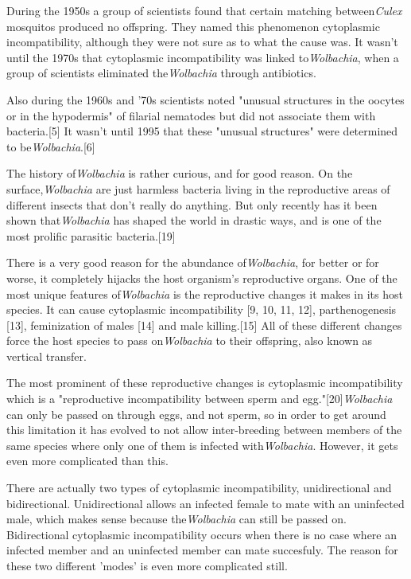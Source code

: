 \documentclass[twocolumn]{article}
\begin{document}
During the 1950s a group of scientists found that certain matching between\textit{Culex} mosquitos produced no offspring. They named this phenomenon cytoplasmic incompatibility, although they were not sure as to what the cause was.\cite{Wcyto_iso} It wasn't until the 1970s that cytoplasmic incompatibility was linked to\textit{Wolbachia}, when a group of scientists eliminated the\textit{Wolbachia} through antibiotics.\cite{Wcyto_cause}

Also during the 1960s and '70s scientists noted "unusual structures in the oocytes or in the hypodermis" of filarial nematodes but did not associate them with bacteria.[5] It wasn't until 1995 that these "unusual structures" were determined to be\textit{Wolbachia}.[6]

The history of\textit{Wolbachia} is rather curious, and for good reason. On the surface,\textit{Wolbachia} are just harmless bacteria living in the reproductive areas of different insects that don't really do anything. But only recently has it been shown that\textit{Wolbachia} has shaped the world in drastic ways, and is one of the most prolific parasitic bacteria.[19]

There is a very good reason for the abundance of\textit{Wolbachia}, for better or for worse, it completely hijacks the host organism's reproductive organs. One of the most unique features of\textit{Wolbachia} is the reproductive changes it makes in its host species. It can cause cytoplasmic incompatibility [9, 10, 11, 12], parthenogenesis [13], feminization of males [14] and male killing.[15] All of these different changes force the host species to pass on\textit{Wolbachia} to their offspring, also known as vertical transfer.

The most prominent of these reproductive changes is cytoplasmic incompatibility which is a "reproductive incompatibility between sperm and egg."[20]\textit{Wolbachia} can only be passed on through eggs, and not sperm, so in order to get around this limitation it has evolved to not allow inter-breeding between members of the same species where only one of them is infected with\textit{Wolbachia}. However, it gets even more complicated than this.

There are actually two types of cytoplasmic incompatibility, unidirectional and bidirectional. Unidirectional allows an infected female to mate with an uninfected male, which makes sense because the\textit{Wolbachia} can still be passed on. Bidirectional cytoplasmic incompatibility occurs when there is no case where an infected member and an uninfected member can mate succesfuly. The reason for these two different 'modes' is even more complicated still.
\end{document}
